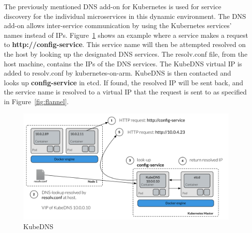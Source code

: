 \noindent
The previously mentioned DNS add-on for Kubernetes is used for service discovery for the individual microservices in this dynamic environment. The DNS add-on allows inter-service communication by using the Kubernetes services' names instead of IPs. Figure~\ref{fig:dns} shows an example where a service makes a request to \textbf{http://config-service}. This service name will then be attempted resolved on the host by looking up the designated DNS services. The resolv.conf file, from the host machine, contains the IPs of the DNS services. The KubeDNS virtual IP is added to resolv.conf by kubernetes-on-arm. KubeDNS is then contacted and looks up \textbf{config-service} in etcd. If found, the resolved IP will be sent back, and the service name is resolved to a virtual IP that the request is sent to as specified in Figure~\ref{fig:flannel}. 

\begin{figure}[H]
    \centering
    \includegraphics[width=12cm]{figures/kubernetes/kubedns}
    \caption{KubeDNS}
    \label{fig:dns}
\end{figure}